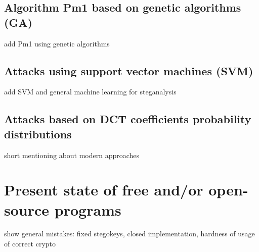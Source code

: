 \subsection{Algorithm Pm1 based on genetic algorithms (GA)}


\TODO add Pm1 using genetic algorithms


\subsection{Attacks using support vector machines (SVM)}

\TODO add SVM and general machine learning for steganalysis


\subsection{Attacks based on DCT coefficients probability distributions}
\TODO short mentioning about modern approaches

\section{Present state of free and/or open-source programs}

\TODO show general mistakes: fixed stegokeys, closed implementation, hardness of usage of correct crypto
